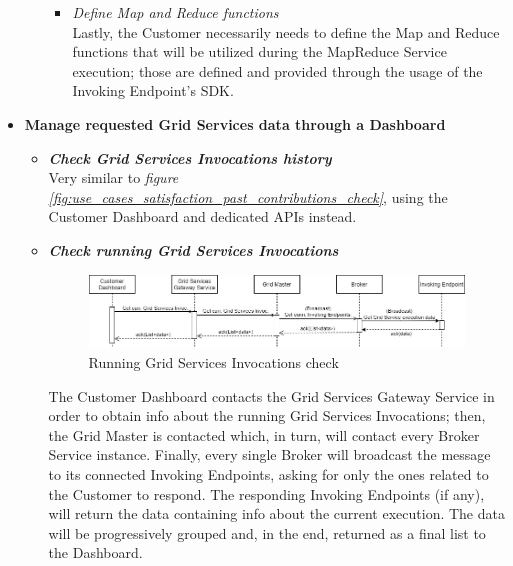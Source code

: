 \begin{itemize}
\begin{itemize}
\begin{itemize}
            \item \textit{Define Map and Reduce functions}\\
            Lastly, the Customer necessarily needs to define the Map and Reduce functions that will be utilized during the MapReduce Service execution; those are defined and provided through the usage of the Invoking Endpoint's SDK.
        \end{itemize}
    \end{itemize}
    \item \textbf{Manage requested Grid Services data through a Dashboard}\\
    \begin{itemize}
        \item \textbf{\textit{Check Grid Services Invocations history}}\\
        Very similar to \textit{figure \ref{fig:use_cases_satisfaction_past_contributions_check}}, using the Customer Dashboard and dedicated APIs instead.

        \item \textbf{\textit{Check running Grid Services Invocations}}\\
        \begin{figure}[!ht]
            \centering
            \includegraphics[width=\linewidth]{document/chapters/chapter_6/images/use_cases_satisfaction_current_grid_services.jpg}
            \caption{Running Grid Services Invocations check}
            \label{fig:use_cases_satisfaction_current_grid_services}
        \end{figure}

        The Customer Dashboard contacts the Grid Services Gateway Service in order to obtain info about the running Grid Services Invocations; then, the Grid Master is contacted which, in turn, will contact every Broker Service instance. Finally, every single Broker will broadcast the message to its connected Invoking Endpoints, asking for only the ones related to the Customer to respond. The responding Invoking Endpoints (if any), will return the data containing info about the current execution. The data will be progressively grouped and, in the end, returned as a final list to the Dashboard. 


\end{itemize}
\end{itemize}
